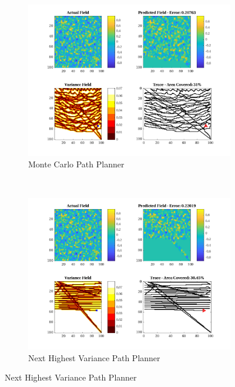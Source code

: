 \begin{figure}[htb!]
    \centering
    \begin{subfigure}[t]{0.5\textwidth}
        \centering
        \includegraphics[width=\linewidth]{figures/hbresults/mc_30p_100x100_sf_1_seed_2.png}
        \captionsetup{skip=0.10\baselineskip,size=footnotesize}
        \caption{Monte Carlo Path Planner}
    \end{subfigure}%
    ~ 
    \begin{subfigure}[t]{0.5\textwidth}
        \centering
        \includegraphics[width=\linewidth]{figures/hbresults/nhv_30p_100x100_sf_1_seed_2.png}
        \captionsetup{skip=0.10\baselineskip,size=footnotesize}
        \caption{Next Highest Variance Path Planner}

\end{subfigure}
\end{figure}
